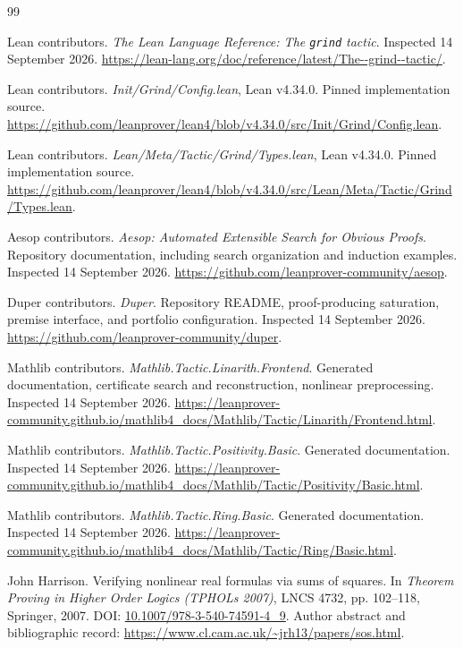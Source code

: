 \clearpage
\begin{thebibliography}{99}
\small
\setlength{\itemsep}{3pt}
\setlength{\parskip}{0pt}
Lean contributors. \emph{The Lean Language Reference: The \texttt{grind} tactic}. Inspected 14 September 2026.
\url{https://lean-lang.org/doc/reference/latest/The--grind--tactic/}.

Lean contributors. \emph{Init/Grind/Config.lean}, Lean v4.34.0. Pinned implementation source.
\url{https://github.com/leanprover/lean4/blob/v4.34.0/src/Init/Grind/Config.lean}.

Lean contributors. \emph{Lean/Meta/Tactic/Grind/Types.lean}, Lean v4.34.0. Pinned implementation source.
\url{https://github.com/leanprover/lean4/blob/v4.34.0/src/Lean/Meta/Tactic/Grind/Types.lean}.

Aesop contributors. \emph{Aesop: Automated Extensible Search for Obvious Proofs}. Repository documentation, including search organization and induction examples. Inspected 14 September 2026.
\url{https://github.com/leanprover-community/aesop}.

Duper contributors. \emph{Duper}. Repository README, proof-producing saturation, premise interface, and portfolio configuration. Inspected 14 September 2026.
\url{https://github.com/leanprover-community/duper}.

Mathlib contributors. \emph{Mathlib.Tactic.Linarith.Frontend}. Generated documentation, certificate search and reconstruction, nonlinear preprocessing. Inspected 14 September 2026.
\url{https://leanprover-community.github.io/mathlib4_docs/Mathlib/Tactic/Linarith/Frontend.html}.

Mathlib contributors. \emph{Mathlib.Tactic.Positivity.Basic}. Generated documentation. Inspected 14 September 2026.
\url{https://leanprover-community.github.io/mathlib4_docs/Mathlib/Tactic/Positivity/Basic.html}.

Mathlib contributors. \emph{Mathlib.Tactic.Ring.Basic}. Generated documentation. Inspected 14 September 2026.
\url{https://leanprover-community.github.io/mathlib4_docs/Mathlib/Tactic/Ring/Basic.html}.

John Harrison. Verifying nonlinear real formulas via sums of squares. In \emph{Theorem Proving in Higher Order Logics (TPHOLs 2007)}, LNCS 4732, pp. 102--118, Springer, 2007.
DOI: \href{https://doi.org/10.1007/978-3-540-74591-4_9}{10.1007/978-3-540-74591-4\_9}.
Author abstract and bibliographic record:
\url{https://www.cl.cam.ac.uk/~jrh13/papers/sos.html}.


\end{thebibliography}
